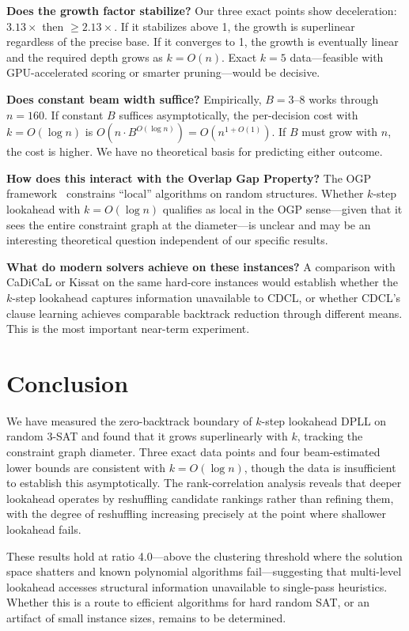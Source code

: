 \documentclass[11pt,a4paper]{article}
\begin{document}
\textbf{Does the growth factor stabilize?} Our three exact points show deceleration: $3.13\times$ then ${\geq}2.13\times$. If it stabilizes above 1, the growth is superlinear regardless of the precise base. If it converges to 1, the growth is eventually linear and the required depth grows as $k = O(n)$. Exact $k = 5$ data---feasible with GPU-accelerated scoring or smarter pruning---would be decisive.

\textbf{Does constant beam width suffice?} Empirically, $B = 3$--$8$ works through $n = 160$. If constant $B$ suffices asymptotically, the per-decision cost with $k = O(\log n)$ is $O(n \cdot B^{O(\log n)}) = O(n^{1 + O(1)})$. If $B$ must grow with $n$, the cost is higher. We have no theoretical basis for predicting either outcome.

\textbf{How does this interact with the Overlap Gap Property?} The OGP framework~\citep{gamarnik2021overlap} constrains ``local'' algorithms on random structures. Whether $k$-step lookahead with $k = O(\log n)$ qualifies as local in the OGP sense---given that it sees the entire constraint graph at the diameter---is unclear and may be an interesting theoretical question independent of our specific results.

\textbf{What do modern solvers achieve on these instances?} A comparison with CaDiCaL or Kissat on the same hard-core instances would establish whether the $k$-step lookahead captures information unavailable to CDCL, or whether CDCL's clause learning achieves comparable backtrack reduction through different means. This is the most important near-term experiment.

\section{Conclusion}

We have measured the zero-backtrack boundary of $k$-step lookahead DPLL on random 3-SAT and found that it grows superlinearly with $k$, tracking the constraint graph diameter. Three exact data points and four beam-estimated lower bounds are consistent with $k = O(\log n)$, though the data is insufficient to establish this asymptotically. The rank-correlation analysis reveals that deeper lookahead operates by reshuffling candidate rankings rather than refining them, with the degree of reshuffling increasing precisely at the point where shallower lookahead fails.

These results hold at ratio 4.0---above the clustering threshold where the solution space shatters and known polynomial algorithms fail---suggesting that multi-level lookahead accesses structural information unavailable to single-pass heuristics. Whether this is a route to efficient algorithms for hard random SAT, or an artifact of small instance sizes, remains to be determined.
\end{document}
